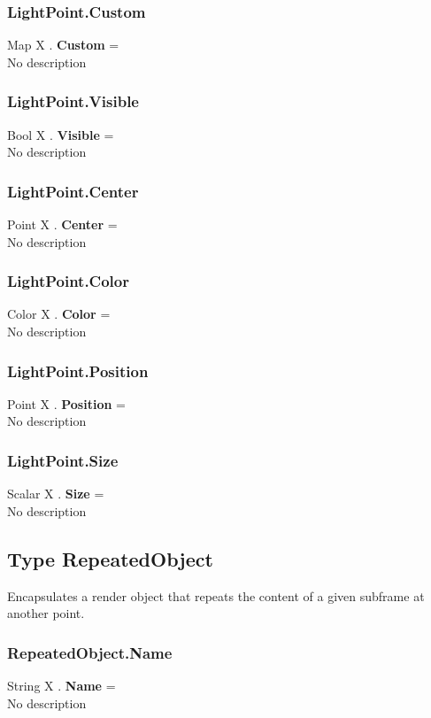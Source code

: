 \documentclass[10pt]{book}
\begin{document}
\subsubsection{LightPoint.Custom \label{F:LightPoint:Custom}}
Map X . \textbf{Custom} = \\
No description

\subsubsection{LightPoint.Visible \label{F:LightPoint:Visible}}
Bool X . \textbf{Visible} = \\
No description

\subsubsection{LightPoint.Center \label{F:LightPoint:Center}}
Point X . \textbf{Center} = \\
No description

\subsubsection{LightPoint.Color \label{F:LightPoint:Color}}
Color X . \textbf{Color} = \\
No description

\subsubsection{LightPoint.Position \label{F:LightPoint:Position}}
Point X . \textbf{Position} = \\
No description

\subsubsection{LightPoint.Size \label{F:LightPoint:Size}}
Scalar X . \textbf{Size} = \\
No description

\subsection{Type RepeatedObject \label{T:RepeatedObject}}
Encapsulates a render object that repeats the content of a given subframe at another point.

\subsubsection{RepeatedObject.Name \label{F:RepeatedObject:Name}}
String X . \textbf{Name} = \\
No description
\end{document}

